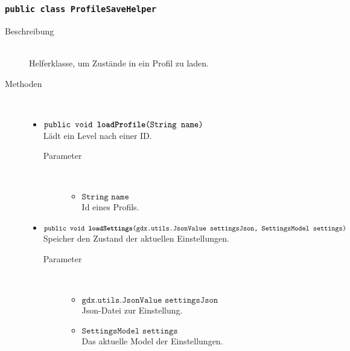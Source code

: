 \subsubsection{\normalfont \texttt{public class \textbf{ProfileSaveHelper}}}

\begin{description}
\item[Beschreibung] \hfill \\ Helferklasse, um Zustände in ein Profil zu laden.

\item[Methoden] \hfill \\
	\vspace{-.8cm}
	\begin{itemize}
		\item $\texttt{public void \textbf{loadProfile}(String name)}$ \\ Lädt ein Level nach einer ID.
		\begin{description}
			\item[Parameter] \hfill \\
			\vspace{-.8cm}
			\begin{itemize}
				\item $\texttt{String name}$ \\ Id eines Profils.
			\end{itemize}
		\end{description}
		

		\item $\texttt{public void \textbf{loadSettings}(gdx.utils.JsonValue settingsJson, SettingsModel settings)}$ \\ Speicher den Zustand der aktuellen Einstellungen.
				\begin{description}
			\item[Parameter] \hfill \\
			\vspace{-.8cm}
			\begin{itemize}
				\item $\texttt{gdx.utils.JsonValue settingsJson}$ \\ Json-Datei zur Einstellung.
								\item $\texttt{SettingsModel settings}$ \\ Das aktuelle Model der Einstellungen.
			\end{itemize}
		\end{description}
		


\end{itemize}
\end{description}
